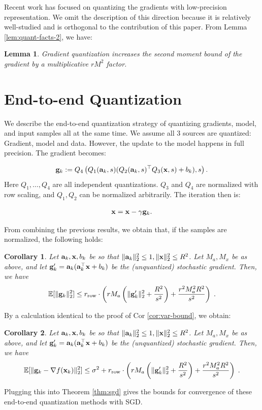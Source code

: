 \documentclass{article}
\def\a{{\bf a}}
\def\g{{\bf g}}
\def\x{{\bf x}}
\def\E{\mathbb{E}}
\def\rrow{r_\mathrm{row}}
\newtheorem{lemma}{Lemma}
\newtheorem{corollary}{Corollary}
\begin{document}
Recent work has focused on quantizing the gradients 
with low-precision representation.
We omit the description of this direction
because it is relatively well-studied and is orthogonal
to the contribution of this paper.
From Lemma \ref{lem:quant-facts-2}, we have:

\begin{lemma}
    \label{lem:gradient-quantization}
    Gradient quantization increases the second moment bound of the gradient by a multiplicative $r M^2$ factor. 
\end{lemma}


\section{End-to-end Quantization}

We describe the end-to-end quantization strategy of
quantizing gradients, model, and input samples all 
at the same time. We assume all 3 sources are quantized: Gradient, model and data. However, the update to the model happens in full precision. The gradient becomes:

\begin{eqnarray}
	\g_k := Q_4 \left( Q_1(\a_k, s ) ( Q_2(\a_k, s)^\top Q_3(\x, s) + b_k) , s \right).
\end{eqnarray}
\noindent Here $Q_1, \ldots, Q_4$ are all independent quantizations.  $Q_3$ and  $Q_4$ are normalized with row scaling, and $Q_1, Q_2$ can be normalized arbitrarily.
The iteration then is: 

\begin{eqnarray}
	\x = \x - \gamma \g_k.
\end{eqnarray}

\noindent From combining the previous results, we obtain that, if the samples are normalized, the following holds:

\begin{corollary}
    \label{cor:full-quantization}
    Let $\a_k, \x, b_k$ be so that $\| \a_k \|_2^2 \leq 1, \| \x \|_2^2 \leq R^2$.
    Let $M_a, M_x$ be as above, and let $\g'_k = \a_k (\a_k^\top \x + b_k)$ be the (unquantized) stochastic gradient.
    Then, we have
    \[
    \E [\| \g_k \|_2^2] \leq \rrow \cdot \left( r M_a \left( \| \g'_k \|_2^2 + \frac{R^2}{s^2} \right)  + \frac{r^2 M_a^2 R^2}{s^2} \right) \; .
    \]
\end{corollary}

By a calculation identical to the proof of Cor \ref{cor:var-bound}, we obtain:
\begin{corollary}
    \label{cor:full-quantizationVar}
    Let $\a_k, \x, b_k$ be so that $\| \a_k \|_2^2 \leq 1, \| \x \|_2^2 \leq R^2$.
    Let $M_a, M_x$ be as above, and let $\g'_k = \a_k (\a_k^\top \x + b_k)$ be the (unquantized) stochastic gradient.
    Then, we have
    \[
    \E [\| \g_k - \nabla f(\x_k) \|_2^2] \leq \sigma^2 + \rrow \cdot \left( r M_a \left( \| \g'_k \|_2^2 + \frac{R^2}{s^2} \right)  + \frac{r^2 M_a^2 R^2}{s^2} \right) \; .
    \]
\end{corollary}
Plugging this into Theorem \ref{thm:sgd} gives the bounds for convergence of these end-to-end quantization methods with SGD.
\end{document}
